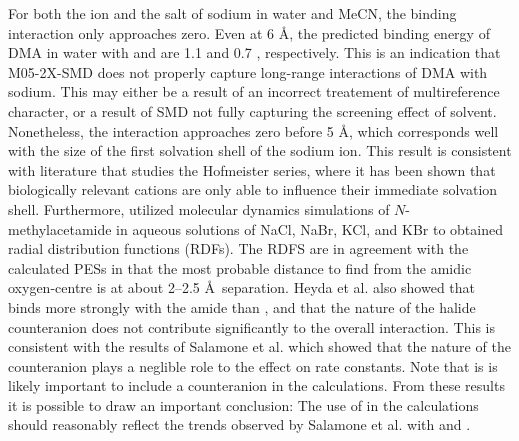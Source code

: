 For both the ion and the salt of sodium in water and MeCN, the binding
interaction only approaches zero. Even at 6 \AA, the predicted binding energy
of DMA in water with  and  are 1.1 and 0.7 \kcalmol,
respectively. This is an indication that M05-2X-SMD does not properly capture
long-range interactions of DMA with sodium. This may either be a result of an
incorrect treatement of multireference character, or a result of SMD not fully
capturing the screening effect of solvent. Nonetheless, the interaction
approaches zero before 5 \AA, which corresponds well with the size of the first
solvation shell of the sodium ion.\cite{Degreve1996} This result is consistent
with literature that studies the Hofmeister series, where it has been shown
that biologically relevant cations are only able to influence their immediate
solvation shell.\cite{Omta2003, Funkner2011} Furthermore, \citet{Heyda2009}
utilized molecular dynamics simulations of $N$-methylacetamide in aqueous
solutions of NaCl, NaBr, KCl, and KBr to obtained radial distribution functions
(RDFs). The RDFS are in agreement with the calculated PESs in that the most
probable distance to find  from the amidic oxygen-centre is at about
2--2.5 \AA\ separation. Heyda et al. also showed that  binds more
strongly with the amide than , and that the nature of the halide
counteranion does not contribute significantly to the overall interaction. This
is consistent with the results of Salamone et al. which showed that the nature
of the counteranion plays a neglible role to the effect on rate
constants.\cite{Salamone2013a} Note that is is likely important to
include a counteranion in the calculations. From these results it is possible
to draw an important conclusion: The use of  in the calculations
should reasonably reflect the trends observed by Salamone et al.  with
 and .


